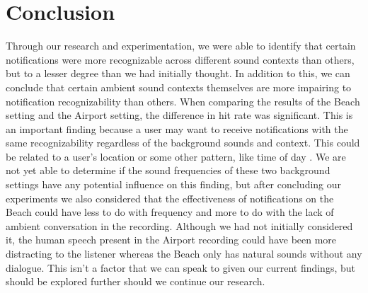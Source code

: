 \documentclass[manuscript,screen,review]{acmart}
\begin{document}
\section{Conclusion}
Through our research and experimentation, we were able to identify that certain notifications were more recognizable across different sound contexts than others, but to a lesser degree than we had initially thought. In addition to this, we can conclude that certain ambient sound contexts themselves are more impairing to notification recognizability than others. When comparing the results of the Beach setting and the Airport setting, the difference in hit rate was significant. This is an important finding because a user may want to receive notifications with the same recognizability regardless of the background sounds and context. This could be related to a user's location or some other pattern, like time of day \cite{3406324.3417145}. We are not yet able to determine if the sound frequencies of these two background settings have any potential influence on this finding, but after concluding our experiments we also considered that the effectiveness of notifications on the Beach could have less to do with frequency and more to do with the lack of ambient conversation in the recording. Although we had not initially considered it, the human speech present in the Airport recording could have been more distracting to the listener whereas the Beach only has natural sounds without any dialogue. This isn't a factor that we can speak to given our current findings, but should be explored further should we continue our research.
\end{document}
